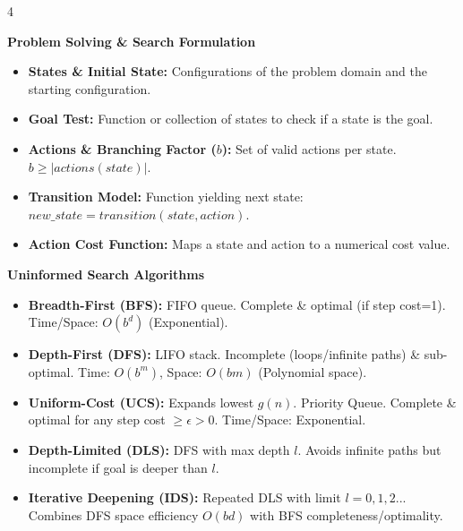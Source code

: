 \documentclass[8pt,landscape,a4paper]{extarticle}
\begin{document}
\begin{multicols*}{4}
{\vspace{1mm}
\noindent\textbf{Problem Solving \& Search Formulation}
\begin{itemize}[leftmargin=*, nosep]
    \item \textbf{States \& Initial State:} Configurations of the problem domain and the starting configuration.
    \item \textbf{Goal Test:} Function or collection of states to check if a state is the goal.
    \item \textbf{Actions \& Branching Factor ($b$):} Set of valid actions per state. $b \ge |actions(state)|$.
    \item \textbf{Transition Model:} Function yielding next state: $new\_state = transition(state, action)$.
    \item \textbf{Action Cost Function:} Maps a state and action to a numerical cost value.
\end{itemize}

\noindent\textbf{Uninformed Search Algorithms}
\begin{itemize}[leftmargin=*, nosep]
    \item \textbf{Breadth-First (BFS):} FIFO queue. Complete \& optimal (if step cost=1). Time/Space: $O(b^d)$ (Exponential).
    \item \textbf{Depth-First (DFS):} LIFO stack. Incomplete (loops/infinite paths) \& sub-optimal. Time: $O(b^m)$, Space: $O(bm)$ (Polynomial space).
    \item \textbf{Uniform-Cost (UCS):} Expands lowest $g(n)$. Priority Queue. Complete \& optimal for any step cost $\ge \epsilon > 0$. Time/Space: Exponential.
    \item \textbf{Depth-Limited (DLS):} DFS with max depth $l$. Avoids infinite paths but incomplete if goal is deeper than $l$.
    \item \textbf{Iterative Deepening (IDS):} Repeated DLS with limit $l = 0, 1, 2...$ Combines DFS space efficiency $O(bd)$ with BFS completeness/optimality.
\end{itemize}

}
\end{multicols*}
\end{document}
